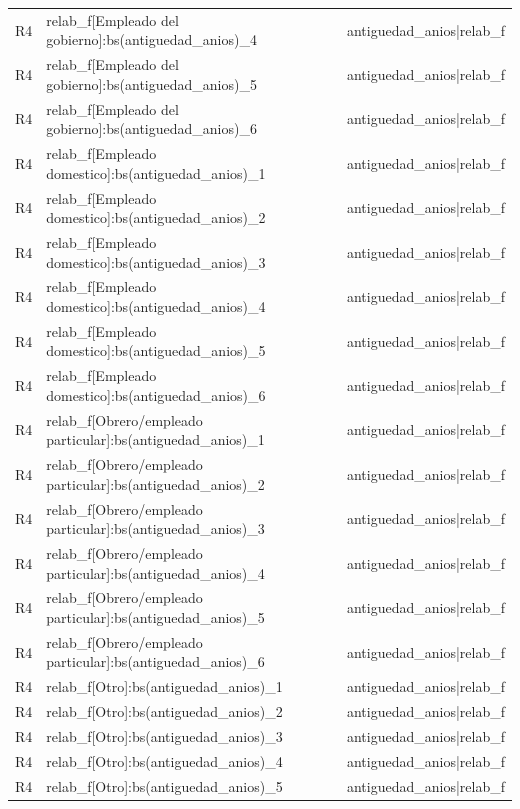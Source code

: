 \begin{longtable}{lll}
R4 & relab\_f[Empleado del gobierno]:bs(antiguedad\_anios)\_4 & antiguedad\_anios|relab\_f \\
R4 & relab\_f[Empleado del gobierno]:bs(antiguedad\_anios)\_5 & antiguedad\_anios|relab\_f \\
R4 & relab\_f[Empleado del gobierno]:bs(antiguedad\_anios)\_6 & antiguedad\_anios|relab\_f \\
R4 & relab\_f[Empleado domestico]:bs(antiguedad\_anios)\_1 & antiguedad\_anios|relab\_f \\
R4 & relab\_f[Empleado domestico]:bs(antiguedad\_anios)\_2 & antiguedad\_anios|relab\_f \\
R4 & relab\_f[Empleado domestico]:bs(antiguedad\_anios)\_3 & antiguedad\_anios|relab\_f \\
R4 & relab\_f[Empleado domestico]:bs(antiguedad\_anios)\_4 & antiguedad\_anios|relab\_f \\
R4 & relab\_f[Empleado domestico]:bs(antiguedad\_anios)\_5 & antiguedad\_anios|relab\_f \\
R4 & relab\_f[Empleado domestico]:bs(antiguedad\_anios)\_6 & antiguedad\_anios|relab\_f \\
R4 & relab\_f[Obrero/empleado particular]:bs(antiguedad\_anios)\_1 & antiguedad\_anios|relab\_f \\
R4 & relab\_f[Obrero/empleado particular]:bs(antiguedad\_anios)\_2 & antiguedad\_anios|relab\_f \\
R4 & relab\_f[Obrero/empleado particular]:bs(antiguedad\_anios)\_3 & antiguedad\_anios|relab\_f \\
R4 & relab\_f[Obrero/empleado particular]:bs(antiguedad\_anios)\_4 & antiguedad\_anios|relab\_f \\
R4 & relab\_f[Obrero/empleado particular]:bs(antiguedad\_anios)\_5 & antiguedad\_anios|relab\_f \\
R4 & relab\_f[Obrero/empleado particular]:bs(antiguedad\_anios)\_6 & antiguedad\_anios|relab\_f \\
R4 & relab\_f[Otro]:bs(antiguedad\_anios)\_1 & antiguedad\_anios|relab\_f \\
R4 & relab\_f[Otro]:bs(antiguedad\_anios)\_2 & antiguedad\_anios|relab\_f \\
R4 & relab\_f[Otro]:bs(antiguedad\_anios)\_3 & antiguedad\_anios|relab\_f \\
R4 & relab\_f[Otro]:bs(antiguedad\_anios)\_4 & antiguedad\_anios|relab\_f \\
R4 & relab\_f[Otro]:bs(antiguedad\_anios)\_5 & antiguedad\_anios|relab\_f \\

\end{longtable}
